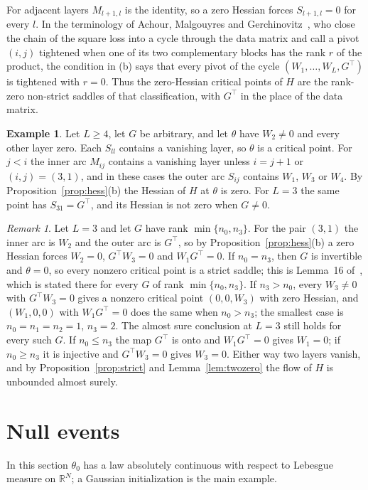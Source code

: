 \documentclass[11pt]{amsart}
\theoremstyle{definition}
\newtheorem{example}[theorem]{Example}
\theoremstyle{remark}
\newtheorem{remark}[theorem]{Remark}
\numberwithin{equation}{section}
\newcommand{\RR}{\mathbb{R}}
\begin{document}
For adjacent layers $M_{l+1,l}$ is the identity, so a zero Hessian forces $S_{l+1,l}=0$ for every $l$. In the terminology of Achour, Malgouyres and Gerchinovitz~\cite[Definitions~3, 5 and~6, Theorem~7]{AMG}, who close the chain of the square loss into a cycle through the data matrix and call a pivot $(i,j)$ tightened when one of its two complementary blocks has the rank $r$ of the product, the condition in (b) says that every pivot of the cycle $(W_1,\dots,W_L,G^\top)$ is tightened with $r=0$. Thus the zero-Hessian critical points of $H$ are the rank-zero non-strict saddles of that classification, with $G^\top$ in the place of the data matrix.

\begin{example}\label{ex:onelayer}
Let $L\ge4$, let $G$ be arbitrary, and let $\theta$ have $W_2\ne0$ and every other layer zero. Each $S_{ll}$ contains a vanishing layer, so $\theta$ is a critical point. For $j<i$ the inner arc $M_{ij}$ contains a vanishing layer unless $i=j+1$ or $(i,j)=(3,1)$, and in these cases the outer arc $S_{ij}$ contains $W_1$, $W_3$ or $W_4$. By Proposition~\ref{prop:hess}(b) the Hessian of $H$ at $\theta$ is zero. For $L=3$ the same point has $S_{31}=G^\top$, and its Hessian is not zero when $G\ne0$.
\end{example}

\begin{remark}\label{rem:three}
Let $L=3$ and let $G$ have rank $\min\{n_0,n_3\}$. For the pair $(3,1)$ the inner arc is $W_2$ and the outer arc is $G^\top$, so by Proposition~\ref{prop:hess}(b) a zero Hessian forces $W_2=0$, $G^\top W_3=0$ and $W_1G^\top=0$. If $n_0=n_3$, then $G$ is invertible and $\theta=0$, so every nonzero critical point is a strict saddle; this is Lemma~16 of~\cite{JGSHG}, which is stated there for every $G$ of rank $\min\{n_0,n_3\}$. If $n_3>n_0$, every $W_3\ne0$ with $G^\top W_3=0$ gives a nonzero critical point $(0,0,W_3)$ with zero Hessian, and $(W_1,0,0)$ with $W_1G^\top=0$ does the same when $n_0>n_3$; the smallest case is $n_0=n_1=n_2=1$, $n_3=2$. The almost sure conclusion at $L=3$ still holds for every such $G$. If $n_0\le n_3$ the map $G^\top$ is onto and $W_1G^\top=0$ gives $W_1=0$; if $n_0\ge n_3$ it is injective and $G^\top W_3=0$ gives $W_3=0$. Either way two layers vanish, and by Proposition~\ref{prop:strict} and Lemma~\ref{lem:twozero} the flow of $H$ is unbounded almost surely.
\end{remark}

\section{Null events}\label{sec:null}
In this section $\theta_0$ has a law absolutely continuous with respect to Lebesgue measure on $\RR^N$; a Gaussian initialization is the main example.
\end{document}
